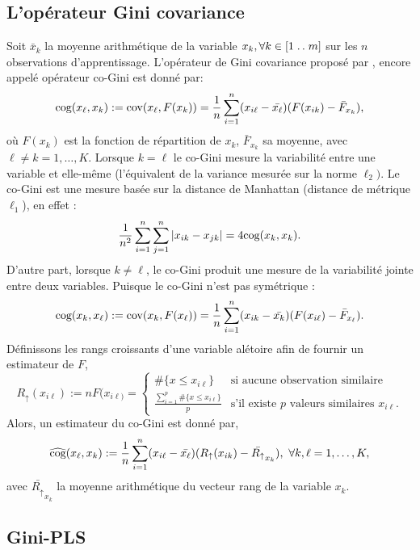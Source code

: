 \subsection{L'opérateur Gini covariance}

Soit $\bar{x}_k$ la moyenne arithmétique de la variable $x_k, \forall k \in [1\mathrel{{.}\,{.}}\nobreak m]$ sur les $n$ observations d'apprentissage. L'opérateur de Gini covariance proposé par \citet{Schechtman03}, encore appelé opérateur co-Gini est donné par:
\begin{equation}\label{cog0}
\text{cog}(x_\ell,x_k) := \text{cov}(x_\ell,F(x_k)) = \frac{1}{n}\sum_{i=1}^n(x_{i\ell} -\bar{x_\ell})(F(x_{ik})-\bar{F}_{x_k}),
\end{equation}
où $F(x_{k})$ est la fonction de répartition de $x_k$, $\bar{F}_{x_k}$ sa moyenne, avec $\ell \neq k = 1,\ldots,K$. Lorsque $k=\ell$ le co-Gini mesure la variabilité entre une variable et elle-même (l'équivalent de la variance mesurée sur la norme $\ell_2)$. Le co-Gini est une mesure basée sur la distance de Manhattan (distance de métrique $\ell_1$), en effet :
\begin{equation}\notag
\frac{1}{n^2}\sum_{i=1}^n\sum_{j=1}^n |x_{ik} - x_{jk}| = 4\text{cog}(x_k,x_k).
\end{equation}
D'autre part, lorsque $k\neq \ell$, le co-Gini produit une mesure de la variabilité jointe entre deux variables. Puisque le co-Gini n'est pas symétrique :
\[
\text{cog}(x_k,x_\ell) := \text{cov}(x_k ,F(x_\ell)) = \frac{1}{n}\sum_{i=1}^n(x_{ik} -\bar{x_k})(F(x_{i\ell})-\bar{F}_{x_\ell}).
\]
Définissons les rangs croissants d'une variable alétoire afin de fournir un estimateur de $F$,
\[
R_\uparrow(x_{i\ell}) := nF(x_{i\ell)} = 
\left\{ \begin{array}{ll}
\#\{ x \leq x_{i\ell} \} & \text{si aucune observation similaire} \\
\frac{\sum_{i=1}^p\#\{ x \leq x_{i\ell}  \}}{p} & \text{s'il existe $p$ valeurs similaires $x_{i\ell}$.}
\end{array}
\right.
\]
Alors, un estimateur du co-Gini est donné par,
\begin{eqnarray}\label{cog}
\widehat{\text{cog}}(x_\ell,x_k) := \frac{1}{n}\sum_{i=1}^n(x_{i\ell} -\bar{x_\ell})(R_\uparrow(x_{ik})-\bar{R_\uparrow}_{x_k}), \ \forall k,\ell=1,\ldots,K,
\end{eqnarray}
avec $\bar{R_\uparrow}_{x_k}$ la moyenne arithmétique du vecteur rang de la variable $x_k$. 


\subsection{Gini-PLS}

